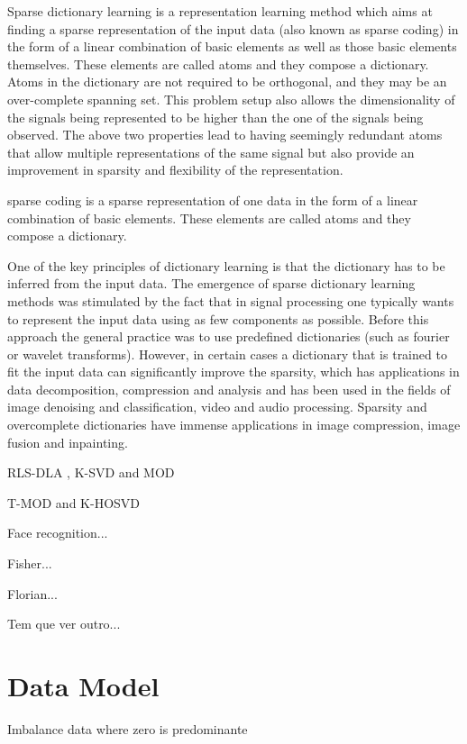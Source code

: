 Sparse dictionary learning is a representation learning method which aims at finding a sparse representation of the input data (also known as sparse coding) in the form of a linear combination of basic elements as well as those basic elements themselves. These elements are called atoms and they compose a dictionary. Atoms in the dictionary are not required to be orthogonal, and they may be an over-complete spanning set. This problem setup also allows the dimensionality of the signals being represented to be higher than the one of the signals being observed. The above two properties lead to having seemingly redundant atoms that allow multiple representations of the same signal but also provide an improvement in sparsity and flexibility of the representation.

sparse coding is a sparse representation of one data in the form of a linear combination of basic elements. These elements are called atoms and they compose a dictionary.

One of the key principles of dictionary learning is that the dictionary has to be inferred from the input data. The emergence of sparse dictionary learning methods was stimulated by the fact that in signal processing one typically wants to represent the input data using as few components as possible. Before this approach the general practice was to use predefined dictionaries (such as fourier or wavelet transforms). However, in certain cases a dictionary that is trained to fit the input data can significantly improve the sparsity, which has applications in data decomposition, compression and analysis and has been used in the fields of image denoising and classification, video and audio processing. Sparsity and overcomplete dictionaries have immense applications in image compression, image fusion and inpainting.

RLS-DLA \cite{skretting2010recursive}, K-SVD \cite{aharon2006rm} and MOD \cite{engan1999method}

T-MOD and K-HOSVD \cite{roemer2014tensor} 

Face recognition...

Fisher...

Florian...

Tem que ver outro...


\section{Data Model}
\label{sec:4_datamodel}

Imbalance data where zero is predominante

